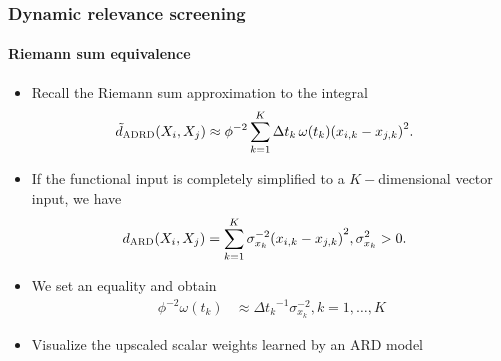 \documentclass{snedecorbeamer}
\begin{document}
\begin{frame}%
  \label{frm:upscaled-weights}
  \frametitle{Dynamic relevance screening}
  \framesubtitle{Riemann sum equivalence}

  \begin{itemize}
  \item Recall the Riemann sum approximation to the integral
    \begin{align}
      \tilde{d}_{\textsc{ADRD}}(X_i, X_j)
      &\approx
        \phi^{-2}\sum_{k=1}^{K} \Delta t_k\,\omega(t_k) {(x_{i,k} - x_{j,k})}^2.
    \end{align}
  \item If the functional input is completely simplified to a $K-$dimensional
    vector input, we have
    \begin{align}
      \label{eq:01-adrd-ard-norm}
      d_{\textsc{ARD}}(X_i, X_j)
      &= \sum_{k = 1}^{K}{\sigma_{x_k}^{-2}(x_{i,k} - x_{j, k})}^2,
        \sigma_{x_k}^2 > 0.
    \end{align}
  \item We set an equality and obtain
    \begin{align}
      \phi^{-2}\omega(t_k)
      &\approx {\Delta t_k}^{-1} \sigma^{-2}_{x_k}, k = 1,\dots, K
    \end{align}
  \item Visualize the upscaled scalar weights learned by an \textsc{ARD} model
  \end{itemize}
\end{frame}
\end{document}
